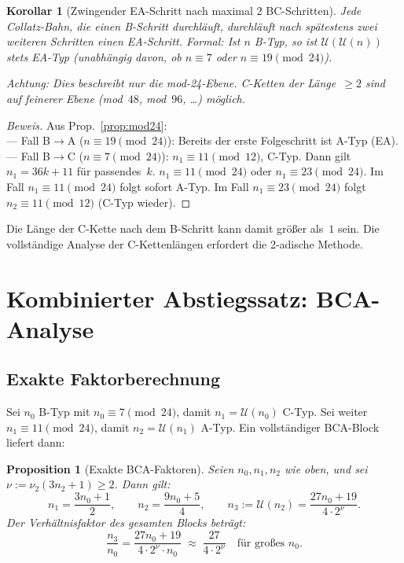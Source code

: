 \documentclass[12pt,a4paper]{article}
\newtheorem{proposition}[definition]{Proposition}
\newtheorem{korollar}[definition]{Korollar}
\newenvironment{beweis}{\begin{proof}[Beweis]}{\end{proof}}
\newcommand{\vii}{\nu_2}
\newcommand{\U}{\mathcal{U}}
\begin{document}
\begin{korollar}[Zwingender EA-Schritt nach maximal 2 BC-Schritten]
\label{kor:bca}
Jede Collatz-Bahn, die einen B-Schritt durchläuft, durchläuft nach
spätestens zwei weiteren Schritten einen EA-Schritt. Formal:
Ist $n$ B-Typ, so ist $\U(\U(n))$ stets EA-Typ
(unabhängig davon, ob $n \equiv 7$ oder $n \equiv 19 \pmod{24}$).

\emph{Achtung:} Dies beschreibt nur die mod-24-Ebene. C-Ketten der Länge~$\geq 2$
sind auf feinerer Ebene (mod~$48$, mod~$96$, \ldots) möglich.
\end{korollar}

\begin{beweis}
Aus Prop.~\ref{prop:mod24}: \\
--- Fall B$\to$A ($n \equiv 19 \pmod{24}$): Bereits der erste Folgeschritt ist A-Typ (EA). \\
--- Fall B$\to$C ($n \equiv 7 \pmod{24}$): $n_1 \equiv 11 \pmod{12}$, C-Typ.
Dann gilt $n_1 = 36k+11$ für passendes~$k$.
$n_1 \equiv 11 \pmod{24}$ oder $n_1 \equiv 23 \pmod{24}$.
Im Fall $n_1 \equiv 11 \pmod{24}$ folgt sofort A-Typ.
Im Fall $n_1 \equiv 23 \pmod{24}$ folgt $n_2 \equiv 11 \pmod{12}$ (C-Typ wieder).
\end{beweis}

Die Länge der C-Kette nach dem B-Schritt kann damit größer als~$1$ sein.
Die vollständige Analyse der C-Kettenlängen erfordert die 2-adische Methode.

\section{Kombinierter Abstiegssatz: BCA-Analyse}
\label{sec:bca}

\subsection{Exakte Faktorberechnung}

Sei $n_0$ B-Typ mit $n_0 \equiv 7 \pmod{24}$, damit $n_1 = \U(n_0)$ C-Typ.
Sei weiter $n_1 \equiv 11 \pmod{24}$, damit $n_2 = \U(n_1)$ A-Typ.
Ein vollständiger B\textbullet C\textbullet A-Block liefert dann:

\begin{proposition}[Exakte B\textbullet C\textbullet A-Faktoren]
\label{prop:bca-faktoren}
Seien $n_0, n_1, n_2$ wie oben, und sei $\nu := \vii(3n_2+1) \geq 2$.
Dann gilt:
\[
  n_1 = \frac{3n_0 + 1}{2}, \qquad
  n_2 = \frac{9n_0 + 5}{4}, \qquad
  n_3 := \U(n_2) = \frac{27n_0 + 19}{4 \cdot 2^\nu}.
\]
Der Verhältnisfaktor des gesamten Blocks beträgt:
\[
  \frac{n_3}{n_0}
  = \frac{27n_0 + 19}{4 \cdot 2^\nu \cdot n_0}
  \;\approx\; \frac{27}{4 \cdot 2^\nu}
  \quad\text{für großes }n_0.
\]
\end{proposition}
\end{document}
